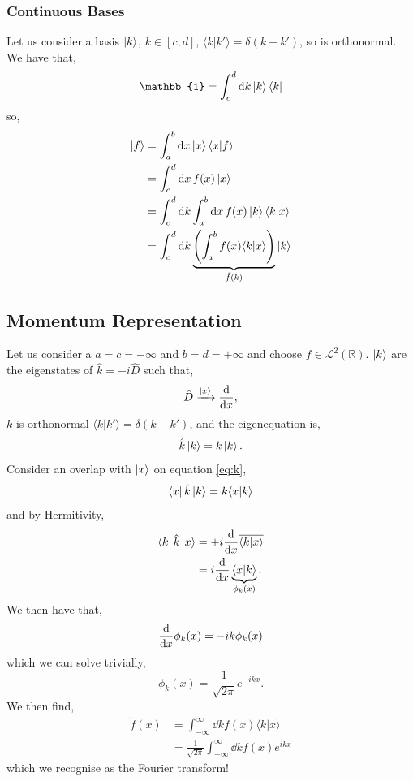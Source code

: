 \documentclass{book}
\renewcommand{\braket}[2]{\langle#1|#2\rangle}
\begin{document}
\subsubsection{Continuous Bases}
Let us consider a basis $\ket{k}$, $k \in \left[c,d\right]$, $\braket{k}{k'} = \delta(k - k')$, so is orthonormal. We have that,
\begin{equation}
	\mathbb{1} = \int_c^d \dd{k}\ket{k}\bra{k}
\end{equation}
so,
\begin{equation}
	\begin{split}
		\ket{f} &= \int_a^b\dd{x}\ket{x}\bra{x}\ket{f} \\
		& = \int_c^d \dd{x}f(x)\ket{x} \\
		& = \int_c^d\dd{k} \int_a^b \dd{x}f(x)\ket{k}\braket{k}{x} \\
		& = \int_c^d \dd{k} \underbrace{\left(\int_a^bf(x)\braket{k}{x}\right)}_{\tilde{f}(k)}\ket{k}
	\end{split}
\end{equation}
\subsection{Momentum Representation}
Let us consider a $a = c = -\infty$ and $b = d = +\infty$ and choose $f \in \mathcal{L}^2(\mathbb{R})$. $\ket{k}$ are the eigenstates of $\hat{k} = -i\hat{D}$ such that,
\begin{equation}
	\hat{D} \xrightarrow{\ket{x}}\dv{x},
\end{equation}
$k$ is orthonormal $\braket{k}{k'} = \delta(k - k')$, and the eigenequation is,
\begin{equation}
	\hat{k}\ket{k} = k\ket{k}. \label{eq:k}
\end{equation}
Consider an overlap with $\ket{x}$ on equation \eqref{eq:k},
\begin{equation}
	\bra{x}\hat{k}\ket{k} = k \braket{x}{k}
\end{equation}
and by Hermitivity,
\begin{equation}
	\begin{split}
	\bra{k}\hat{k}\ket{x} &= +i\dv{x}\overline{\braket{k}{x}}\\
	& = i\dv{x}\underbrace{\braket{x}{k}}_{\phi_k(x)}.
	\end{split}
\end{equation}
We then have that,
\begin{equation}
	\dv{x}\phi_k(x) = -ik\phi_k(x)
\end{equation}
which we can solve trivially,
\begin{equation}
	\phi_k(x) = \frac{1}{\sqrt{2\pi}} e^{-ikx}.
\end{equation}
We then find,
\begin{equation}
	\begin{split}
		\tilde{f}(x) & = \int_{-\infty}^{\infty}\dd{k}f(x) \braket{k}{x} \\
		& = \frac{1}{\sqrt{2\pi}}\int_{-\infty}^{\infty}\dd{k}f(x)e^{ikx}
	\end{split}
\end{equation}
which we recognise as the Fourier transform!
\end{document}
